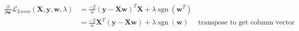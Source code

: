 \newcommand{\matrix}[1]{\mathbf{#1}}
\newcommand{\vector}[1]{\mathbf{#1}}
\newcommand{\X}{\matrix{X}}
\newcommand{\y}{\vector{y}}
\newcommand{\w}{\vector{w}}
\DeclareMathOperator{\sgn}{sgn}
\begin{align*}
\frac{\partial}{\partial \w} \mathcal{L}_{\textit{Lasso}} (\X,\y,\w,\lambda) &= \frac{-2}{n} (\y - \X\w)^T\X + \lambda \sgn(\w^T) \\
&= \frac{-2}{n} \X^T(\y - \X\w) + \lambda \sgn(\w) \quad \text{ transpose to get column vector} \\
\end{align*}
